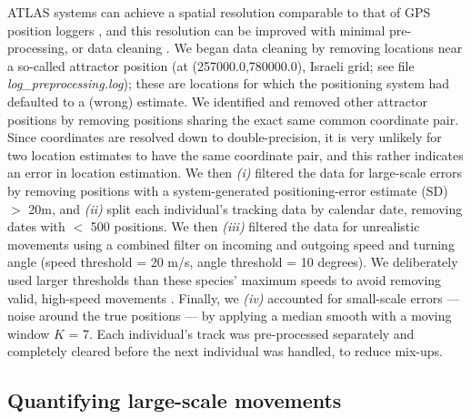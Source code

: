 \begin{refsection}
ATLAS systems can achieve a spatial resolution comparable to that of GPS position loggers \citep{beardsworth2021}, and this resolution can be improved with minimal pre-processing, or data cleaning \citep{beardsworth2021, gupte2021b}.
We began data cleaning by removing locations near a so-called attractor position (at (257000.0,780000.0), Israeli grid; see file \textit{log\_preprocessing.log}); these are locations for which the positioning system had defaulted to a (wrong) estimate.
We identified and removed other attractor positions by removing positions sharing the exact same common coordinate pair. 
Since coordinates are resolved down to double-precision, it is very unlikely for two location estimates to have the same coordinate pair, and this rather indicates an error in location estimation.
%
We then \textit{(i)} filtered the data for large-scale errors by removing positions with a system-generated positioning-error estimate (SD) $>$ 20m, and \textit{(ii)} split each individual's tracking data by calendar date, removing dates with $<$ 500 positions. We then \textit{(iii)} filtered the data for unrealistic movements using a combined filter on incoming and outgoing speed and turning angle (speed threshold = 20 m/s, angle threshold = 10 degrees).
We deliberately used larger thresholds than these species' maximum speeds to avoid removing valid, high-speed movements \citep{gupte2021b}.
Finally, we \textit{(iv)} accounted for small-scale errors --- noise around the true positions --- by applying a median smooth with a moving window $K$ = 7.
Each individual's track was pre-processed separately and completely cleared before the next individual was handled, to reduce mix-ups.

\subsection*{Quantifying large-scale movements}


\end{refsection}

